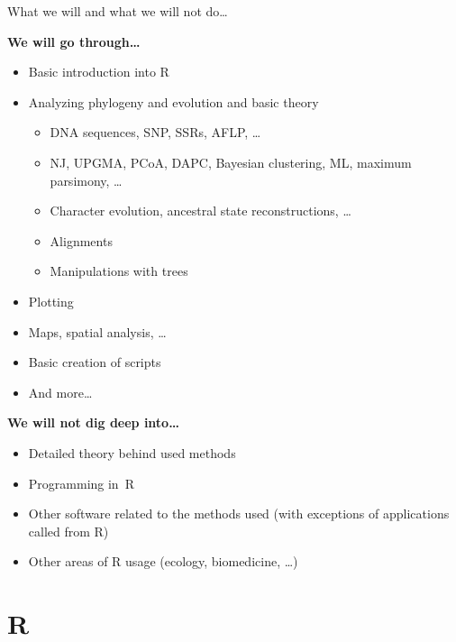 \documentclass[compress, ucs, xelatex, 11pt, xcolor=svgnames,
  hyperref={
    bookmarks=true,
    unicode=true,
    colorlinks=true,
    pdftitle={Molecular data in R},
    plainpages=false,
    pdfauthor={Vojtech Zeisek},
    pdfsubject={Course about phylogeny and evolution in R},
    pdfcreator={XeLaTeX},
    pdfkeywords={R, evolution, phylogeny, molecular data},
    linkcolor=Tomato,
    anchorcolor=SaddleBrown,
    citecolor=Goldenrod,
    filecolor=DarkMagenta,
    menucolor=Sienna,
    urlcolor=DarkTurquoise,
    pdftex},
  url={hyphens, lowtilde} %
  ]{beamer}
\begin{document}
\begin{frame}{What we will and what we will not do\ldots}
\begin{multicols}{2}
  \textbf{We will go through\ldots}
  \begin{itemize}
    \item Basic introduction into R
    \item Analyzing phylogeny and evolution and basic theory
    \begin{itemize}
      \item DNA sequences, SNP, SSRs, AFLP, \ldots
      \item NJ, UPGMA, PCoA, DAPC, Bayesian clustering, ML, maximum parsimony, \ldots
      \item Character evolution, ancestral state reconstructions, \ldots
      \item Alignments
      \item Manipulations with trees
    \end{itemize}
    \item Plotting
  \columnbreak
    \item Maps, spatial analysis, \ldots
    \item Basic creation of scripts
    \item And more\ldots
  \end{itemize}
  \textbf{We will not dig deep into\ldots}
  \begin{itemize}
    \item Detailed theory behind used methods
    \item Programming in~R
    \item Other software related to the methods used (with exceptions of applications called from R)
    \item Other areas of R usage (ecology, biomedicine, \ldots)
  \end{itemize}
\end{multicols}
\end{frame}

\section{R}
\end{document}
